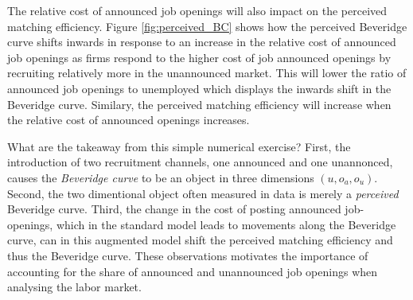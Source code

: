 \documentclass[11pt,article]{memoir}
\begin{document}
The relative cost of announced job openings will also impact on the perceived matching efficiency. 
Figure \ref{fig:perceived_BC} shows how the perceived Beveridge curve shifts inwards in response to an increase in the relative cost of announced job openings as firms respond to the higher cost of job announced openings by recruiting relatively more in the unannounced market. This will lower the ratio of announced job openings to unemployed which displays the inwards shift in the Beveridge curve. Similary, the perceived matching efficiency will increase when the relative cost of announced openings increases.


What are the takeaway from this simple numerical exercise? First, the introduction of two recruitment channels, one announced and one unannonced, causes the \emph{Beveridge curve} to be an object in three dimensions $(u, o_a, o_u)$. Second, the two dimentional object often measured in data is merely a \emph{perceived} Beveridge curve. Third, the change in the cost of posting announced job-openings, which in the standard model leads to movements along the Beveridge curve, can in this augmented model shift the perceived matching efficiency and thus the Beveridge curve. 
These observations motivates the importance of accounting for the share of announced and unannounced job openings when analysing the labor market. 

\end{document}
